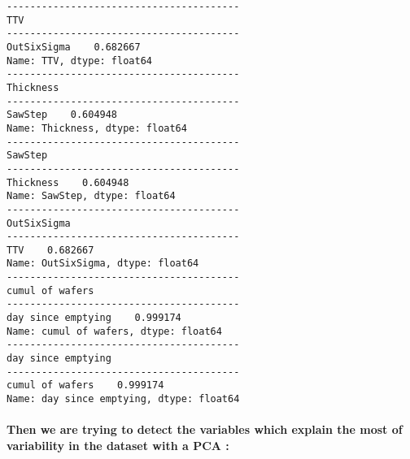 \documentclass[11pt]{article}
\begin{document}
    \begin{Verbatim}[commandchars=\\\{\}]
----------------------------------------
TTV
----------------------------------------
OutSixSigma    0.682667
Name: TTV, dtype: float64
----------------------------------------
Thickness
----------------------------------------
SawStep    0.604948
Name: Thickness, dtype: float64
----------------------------------------
SawStep
----------------------------------------
Thickness    0.604948
Name: SawStep, dtype: float64
----------------------------------------
OutSixSigma
----------------------------------------
TTV    0.682667
Name: OutSixSigma, dtype: float64
----------------------------------------
cumul of wafers
----------------------------------------
day since emptying    0.999174
Name: cumul of wafers, dtype: float64
----------------------------------------
day since emptying
----------------------------------------
cumul of wafers    0.999174
Name: day since emptying, dtype: float64

    \end{Verbatim}

    \paragraph{Then we are trying to detect the variables which explain the
most of variability in the dataset with a PCA
:}\label{then-we-are-trying-to-detect-the-variables-which-explain-the-most-of-variability-in-the-dataset-with-a-pca}
\end{document}
